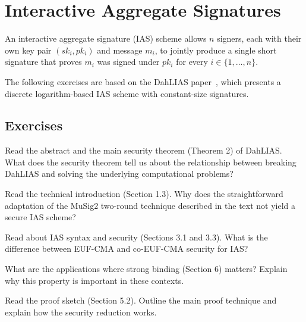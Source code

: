 \section{Interactive Aggregate Signatures}\label{sec:interactive-aggregate-signatures}

An interactive aggregate signature (IAS) scheme allows $n$ signers, each with their own key pair $(sk_i, pk_i)$ and message $m_i$, to jointly produce a single short signature that proves $m_i$ was signed under $pk_i$ for every $i \in \{1, \ldots, n\}$.

The following exercises are based on the DahLIAS paper~\cite{add:nick2025dahlias}, which presents a discrete logarithm-based IAS scheme with constant-size signatures.

\subsection{Exercises}

\begin{exercise}
  Read the abstract and the main security theorem (Theorem 2) of DahLIAS.
  What does the security theorem tell us about the relationship between breaking DahLIAS and solving the underlying computational problems?
\end{exercise}

\begin{exercise}
  Read the technical introduction (Section 1.3).
  Why does the straightforward adaptation of the MuSig2 two-round technique described in the text not yield a secure IAS scheme?
\end{exercise}

\begin{exercise}
  Read about IAS syntax and security (Sections 3.1 and 3.3).
  What is the difference between EUF-CMA and co-EUF-CMA security for IAS?
\end{exercise}

\begin{exercise}
  What are the applications where strong binding (Section 6) matters?
  Explain why this property is important in these contexts.
\end{exercise}

\begin{exercise}[Optional]
  Read the proof sketch (Section 5.2).
  Outline the main proof technique and explain how the security reduction works.
\end{exercise}
